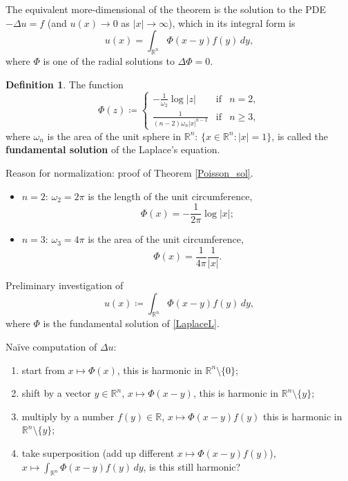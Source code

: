 \documentclass[12pt]{article}
\theoremstyle{definition}
\newtheorem*{definition*}{Definition}
\begin{document}
The equivalent more-dimensional of the theorem is the solution to the PDE $-\Delta u=f$ (and $u(x)\rightarrow0$ as $|x|\to\infty$), which in its integral form is
\[u(x)=\int_{\mathbb{R}^n}\Phi(x-y)f(y)\,dy,\]
where $\Phi$ is one of the radial solutions to $\Delta\Phi=0$.

\begin{definition*}
The function
\[\Phi(z)\coloneqq\left\{\begin{array}{lll}\displaystyle{-\frac{1}{\omega_2}\log|z|}&\text{if}&n=2,\\\displaystyle{\frac{1}{(n-2)\omega_n|x|^{n-2}}}&\text{if}&n\geq3,\end{array}\right.\]
where $\omega_n$ is the area of the unit sphere in $\mathbb{R}^n$: $\{x\in\mathbb{R}^n:|x|=1\}$, is called the \textbf{fundamental solution} of the Laplace's equation.

Reason for normalization: proof of Theorem \ref{Poisson_sol}.
\end{definition*}

\begin{itemize}
\item $n=2$: $\omega_2=2\pi$ is the length of the unit circumference,
\[\Phi(x)=-\frac{1}{2\pi}\log|x|;\]
\item $n=3$: $\omega_3=4\pi$ is the area of the unit circumference,
\[\Phi(x)=\frac{1}{4\pi}\frac{1}{|x|}.\]
\end{itemize}

Preliminary investigation of
\begin{equation}\tag{1}\label{definition_u}
u(x)\coloneqq\int_{\mathbb{R}^n}\Phi(x-y)f(y)\,dy,
\end{equation}
where $\Phi$ is the fundamental solution of \eqref{LaplaceL}.

Na\"{i}ve computation of $\Delta u$:
\begin{enumerate}[label=(\roman*)]
\item start from $x\mapsto\Phi(x)$, this is harmonic in $\mathbb{R}^n\setminus\{0\}$;
\item shift by a vector $y\in\mathbb{R}^n$, $x\mapsto\Phi(x-y)$, this is harmonic in $\mathbb{R}^n\setminus\{y\}$;
\item multiply by a number $f(y)\in\mathbb{R}$, $x\mapsto\Phi(x-y)f(y)$ this is harmonic in $\mathbb{R}^n\setminus\{y\}$;
\item take superposition (add up different $x\mapsto\Phi(x-y)f(y)$), $x\mapsto\int_{\mathbb{R}^n}\Phi(x-y)f(y)\,dy$, is this still harmonic?
\end{enumerate}
\end{document}
